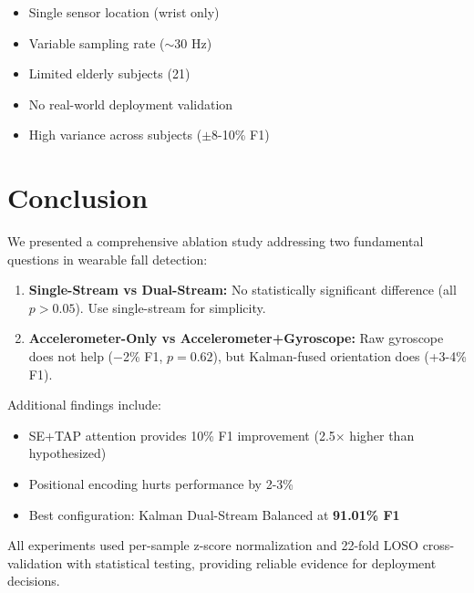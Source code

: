 \documentclass{article}
\begin{document}
\begin{itemize}
    \item Single sensor location (wrist only)
    \item Variable sampling rate ($\sim$30 Hz)
    \item Limited elderly subjects (21)
    \item No real-world deployment validation
    \item High variance across subjects ($\pm$8-10\% F1)
\end{itemize}

\section{Conclusion}

We presented a comprehensive ablation study addressing two fundamental questions in wearable fall detection:

\begin{enumerate}
    \item \textbf{Single-Stream vs Dual-Stream:} No statistically significant difference (all $p > 0.05$). Use single-stream for simplicity.

    \item \textbf{Accelerometer-Only vs Accelerometer+Gyroscope:} Raw gyroscope does not help ($-$2\% F1, $p = 0.62$), but Kalman-fused orientation does (+3-4\% F1).
\end{enumerate}

Additional findings include:
\begin{itemize}
    \item SE+TAP attention provides 10\% F1 improvement (2.5$\times$ higher than hypothesized)
    \item Positional encoding hurts performance by 2-3\%
    \item Best configuration: Kalman Dual-Stream Balanced at \textbf{91.01\% F1}
\end{itemize}

All experiments used per-sample z-score normalization and 22-fold LOSO cross-validation with statistical testing, providing reliable evidence for deployment decisions.

\end{document}
